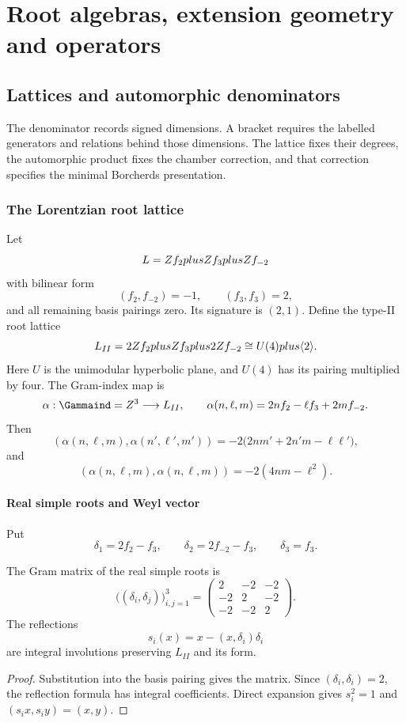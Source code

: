 \part{Root algebras, extension geometry and operators}
\chapter{Lattices and automorphic denominators}
\label{comp:ch:root-data}

The denominator records signed dimensions. A bracket requires the
labelled generators and relations behind those dimensions. The
lattice fixes their degrees, the automorphic product fixes the
chamber correction, and that correction specifies the minimal
Borcherds presentation.

\section{The Lorentzian root lattice}
Let
\[
 L=Z f_2plusZ f_3plusZ f_{-2}
\]
with bilinear form
\[
 (f_2,f_{-2})=-1,
 \qquad (f_3,f_3)=2,
\]
and all remaining basis pairings zero. Its signature is $(2,1)$. Define the type-II root lattice
\[
 L_{II}=2Z f_2plusZ f_3plus2Z f_{-2}
 \cong U(4)plus\langle 2\rangle.
\]
Here $U$ is the unimodular hyperbolic plane, and $U(4)$ has its
pairing multiplied by four.
The Gram-index map is
\[
 \alpha:\Gammaind=\Z^3\longrightarrow L_{II},
 \qquad
 \alpha(n,\ell,m)=2nf_2-\ell f_3+2mf_{-2}.
\]
Then
\[
 (\alpha(n,\ell,m),\alpha(n',\ell',m'))
 =-2\bigl(2nm'+2n'm-\ell\ell'\bigr),
\]
and
\[
 (\alpha(n,\ell,m),\alpha(n,\ell,m))
 =-2(4nm-\ell^2).
\]

\subsection{Real simple roots and Weyl vector}
Put
\[
 \delta_1=2f_2-f_3,
 \qquad
 \delta_2=2f_{-2}-f_3,
 \qquad
 \delta_3=f_3.
\]

\begin{proposition}
The Gram matrix of the real simple roots is
\[
 \bigl((\delta_i,\delta_j)\bigr)_{i,j=1}^3
 =\begin{pmatrix}
 2&-2&-2\\
 -2&2&-2\\
 -2&-2&2
 \end{pmatrix}.
\]
The reflections
\[
 s_i(x)=x-(x,\delta_i)\delta_i
\]
are integral involutions preserving $L_{II}$ and its form.
\end{proposition}
\begin{proof}
Substitution into the basis pairing gives the matrix. Since $(\delta_i,\delta_i)=2$, the reflection formula has integral coefficients. Direct expansion gives $s_i^2=1$ and $(s_ix,s_iy)=(x,y)$.
\end{proof}

